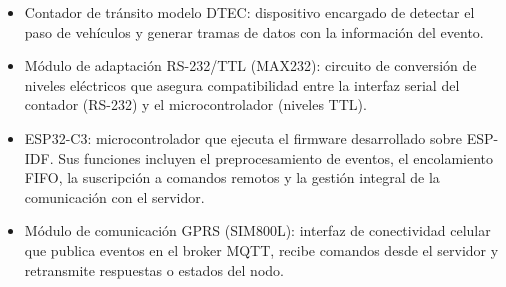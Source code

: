 \begin{itemize}
    \item Contador de tránsito modelo DTEC: dispositivo encargado de detectar el paso de vehículos y generar tramas de datos con la información del evento.
   
    \item Módulo de adaptación RS-232/TTL (MAX232): circuito de conversión de niveles eléctricos que asegura compatibilidad entre la interfaz serial del contador (RS-232) y el microcontrolador (niveles TTL).
      
    \item ESP32-C3: microcontrolador que ejecuta el firmware desarrollado sobre ESP-IDF. Sus funciones incluyen el preprocesamiento de eventos, el encolamiento FIFO, la suscripción a comandos remotos y la gestión integral de la comunicación con el servidor.
   
    \item Módulo de comunicación GPRS (SIM800L): interfaz de conectividad celular que publica eventos en el broker MQTT, recibe comandos desde el servidor y retransmite respuestas o estados del nodo.
    




\end{itemize}
